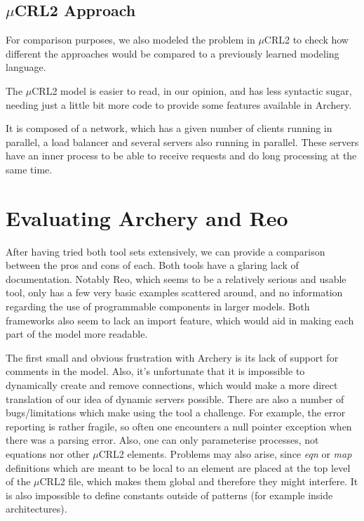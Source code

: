 \documentclass[a4paper]{article}
\newcommand{\ar}{Archery\xspace}
\newcommand{\re}{Reo\xspace}
\newcommand{\mcrl}{$\mu$CRL2\xspace}
\begin{document}
\clearpage
\subsection{\mcrl Approach}
For comparison purposes, we also modeled the problem in \mcrl to check how
different the approaches would be compared to a previously learned modeling language.

The \mcrl model is easier to read, in our opinion, and has less syntactic
sugar, needing just a little bit more code to provide some features
available in \ar.

It is composed of a network, which has a given number of clients running in
parallel, a load balancer and several servers also running in parallel. These
servers have an inner process to be able to receive requests and do long
processing at the same time.


%
%
\section{Evaluating \ar and \re}


After having tried both tool sets extensively, we can provide a comparison between
the pros and cons of each. Both tools have a glaring lack of documentation.
Notably \re, which seems to be a relatively serious and usable tool, only has a
few very basic examples scattered around, and no information regarding the use
of
programmable components in larger models. Both frameworks also seem to lack an
import feature, which would aid in making each part of the model more readable.

The first small and obvious frustration with \ar is its lack of support for
comments in the model. Also, it's unfortunate that it is impossible to
dynamically create and remove connections, which would make a more direct
translation of our idea of dynamic servers possible. There are also a number of
bugs/limitations which make using the tool a challenge. For example, the error
reporting is rather fragile, so often one encounters a null pointer exception when there was a
parsing error. Also, one can only parameterise processes, not equations nor
other \mcrl elements. Problems may also arise, since \textit{eqn} or
\textit{map} definitions which are meant to be local to an element are placed at
the top level of the \mcrl file, which makes them global and therefore they
might interfere. It is also impossible to define constants outside of patterns
(for example inside architectures).
\end{document}
